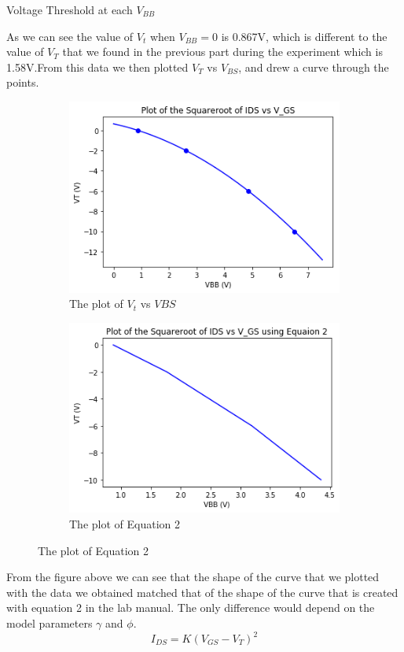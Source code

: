 \begin{table}[ht]
    
    \caption{Voltage Threshold at each $V_{BB}$}
    \label{tab:VT}
\end{table}
As we can see the value of $V_t$ when $V_{BB} = 0$ is 0.867V, which is different to the value of $V_T$ that we found in the previous part during the experiment which is 1.58V.From this data we then plotted $V_T$ vs $V_{BS}$, and drew a curve through the points.\\
\begin{figure}[ht]
    \begin{subfigure}[b]{0.40\linewidth}
    \centering
    \includegraphics[width=0.95\linewidth]{figures/VT_vs_VBB.png}
    \caption{The plot of $V_t$ vs $V{BS}$}
    \label{fig:thers}
    \end{subfigure}
    \begin{subfigure}[b]{0.40\linewidth}
    \centering
    \includegraphics[width=0.95\linewidth]{figures/VT_vs_VBB_EQ2.png}
    \caption{The plot of Equation 2}
    \label{fig:EQ2}
    \end{subfigure}
\end{figure}
From the figure above we can see that the shape of the curve that we plotted with the data we obtained matched that of the shape of the curve that is created with equation 2 in the lab manual. The only difference would depend on the model parameters $\gamma$ and $\phi$.\\
\begin{equation}
    I_{DS} = K(V_{GS} - V_T)^2 
\end{equation}

